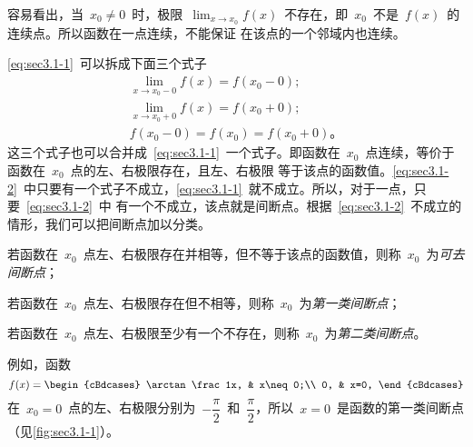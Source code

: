 \begin{remark}
容易看出，当~$x_0\neq0$~时，极限~$\lim_{x\to x_0}f(x)$~不存在，即~$x_0$~不是~$f(x)$~的连续点。所以函数在一点连续，不能保证
在该点的一个邻域内也连续。
\end{remark}

\ref{eq:sec3.1-1}~可以拆成下面三个式子
\begin{equation}\label{eq:sec3.1-2}
\begin{gathered}
\lim_{x\to x_0-0}f(x)=f(x_0-0);\\
\lim_{x\to x_0+0}f(x)=f(x_0+0);\\
f(x_0-0)=f(x_0)=f(x_0+0) 。
\end{gathered}
\end{equation}
这三个式子也可以合并成~\ref{eq:sec3.1-1}~一个式子。即函数在~$x_0$~点连续，等价于函数在~$x_0$~点的左、右极限存在，且左、右极限
等于该点的函数值。\ref{eq:sec3.1-2}~中只要有一个式子不成立，\ref{eq:sec3.1-1}~就不成立。所以，对于一点，只要~\ref{eq:sec3.1-2}~中
有一个不成立，该点就是间断点。根据~\ref{eq:sec3.1-2}~不成立的情形，我们可以把间断点加以分类。

\begin{definition}\label{def:sec3.1-2}
\begin{thmenumlist}
\item 若函数在~$x_0$~点左、右极限存在并相等，但不等于该点的函数值，则称~$x_0$~为\emph{可去间断点}；
\item 若函数在~$x_0$~点左、右极限存在但不相等，则称~$x_0$~为\emph{第一类间断点}；
\item 若函数在~$x_0$~点左、右极限至少有一个不存在，则称~$x_0$~为\emph{第二类间断点}。
\end{thmenumlist}
\end{definition}

例如，函数
\[
  f(x)=\begin{cBdcases}
    \arctan\frac1x, & x\neq0;\\
    0, & x=0,
  \end{cBdcases}
\]
在~$x_0=0$~点的左、右极限分别为~$-\dfrac\pi2$~和~$\dfrac\pi2$，所以~$x=0$~是函数的第一类间断点（见\ref{fig:sec3.1-1}）。

\begin{figure}
\begin{floatrow}[3]
\figurebox{\caption{}\label{fig:sec3.1-1}}{\somefigure}
\figurebox{\caption{}\label{fig:sec3.1-2}}{\somefigure}
\figurebox{\caption{}\label{fig:sec3.1-3}}{\somefigure}
\end{floatrow}
\end{figure}

